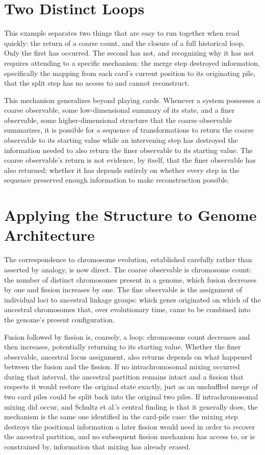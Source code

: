 \documentclass[11pt]{book}
\begin{document}
\section{Two Distinct Loops}

This example separates two things that are easy to run together when read quickly: the return of a coarse count, and the closure of a full historical loop. Only the first has occurred. The second has not, and recognizing why it has not requires attending to a specific mechanism: the merge step destroyed information, specifically the mapping from each card's current position to its originating pile, that the split step has no access to and cannot reconstruct.

This mechanism generalizes beyond playing cards. Whenever a system possesses a coarse observable, some low-dimensional summary of its state, and a finer observable, some higher-dimensional structure that the coarse observable summarizes, it is possible for a sequence of transformations to return the coarse observable to its starting value while an intervening step has destroyed the information needed to also return the finer observable to its starting value. The coarse observable's return is not evidence, by itself, that the finer observable has also returned; whether it has depends entirely on whether every step in the sequence preserved enough information to make reconstruction possible.

\section{Applying the Structure to Genome Architecture}

The correspondence to chromosome evolution, established carefully rather than asserted by analogy, is now direct. The coarse observable is chromosome count: the number of distinct chromosomes present in a genome, which fusion decreases by one and fission increases by one. The fine observable is the assignment of individual loci to ancestral linkage groups: which genes originated on which of the ancestral chromosomes that, over evolutionary time, came to be combined into the genome's present configuration.

Fusion followed by fission is, coarsely, a loop: chromosome count decreases and then increases, potentially returning to its starting value. Whether the finer observable, ancestral locus assignment, also returns depends on what happened between the fusion and the fission. If no intrachromosomal mixing occurred during that interval, the ancestral partition remains intact and a fission that respects it would restore the original state exactly, just as an unshuffled merge of two card piles could be split back into the original two piles. If intrachromosomal mixing did occur, and Schultz et al.'s central finding is that it generally does, the mechanism is the same one identified in the card-pile case: the mixing step destroys the positional information a later fission would need in order to recover the ancestral partition, and no subsequent fission mechanism has access to, or is constrained by, information that mixing has already erased.
\end{document}

